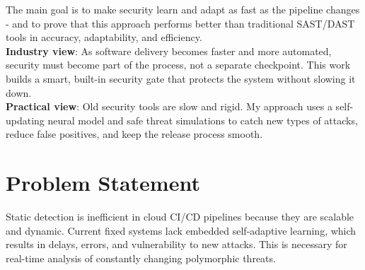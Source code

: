 The main goal is to make security learn and adapt as fast as the pipeline changes - and to prove that this approach performs better than traditional SAST/DAST tools in accuracy, adaptability, and efficiency.\\


\textbf{Industry view}: As software delivery becomes faster and more automated, security must become part of the process, not a separate checkpoint. This work builds a smart, built-in security gate that protects the system without slowing it down.\\

\textbf{Practical view}: Old security tools are slow and rigid. My approach uses a self-updating neural model and safe threat simulations to catch new types of attacks, reduce false positives, and keep the release process smooth.\\



\section{Problem Statement}
Static detection is inefficient in cloud CI/CD pipelines because they are scalable and dynamic. Current fixed systems lack embedded self-adaptive learning, which results in delays, errors, and vulnerability to new attacks. This is necessary for real-time analysis of constantly changing polymorphic threats.\\

\vspace{2mm}

